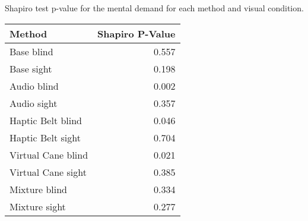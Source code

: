 
\centering
\caption{Shapiro test p-value for the mental demand for each method and visual condition.}
\label{tab:shapiro_nasa_score}
\begin{tabular}{lr}
\toprule
            Method &  Shapiro P-Value \\
\midrule
        Base blind &            0.557 \\
        Base sight &            0.198 \\
       Audio blind &            0.002 \\
       Audio sight &            0.357 \\
 Haptic Belt blind &            0.046 \\
 Haptic Belt sight &            0.704 \\
Virtual Cane blind &            0.021 \\
Virtual Cane sight &            0.385 \\
     Mixture blind &            0.334 \\
     Mixture sight &            0.277 \\
\bottomrule
\end{tabular}
